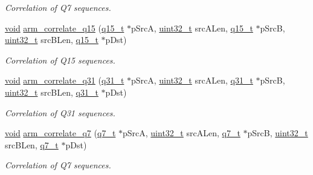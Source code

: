 \begin{DoxyCompactItemize}
\begin{DoxyCompactList}\small\item\em Correlation of Q7 sequences. \end{DoxyCompactList}\item 
\hyperlink{group___n_a_m_e_ga18028b8badbf1ea7e704ccac3c488e82}{void} \hyperlink{group___corr_ga5ec96b8e420d68b0e626df0812274d46}{arm\-\_\-correlate\-\_\-q15} (\hyperlink{arm__math_8h_ab5a8fb21a5b3b983d5f54f31614052ea}{q15\-\_\-t} $\ast$p\-Src\-A, \hyperlink{stdint_8h_a435d1572bf3f880d55459d9805097f62}{uint32\-\_\-t} src\-A\-Len, \hyperlink{arm__math_8h_ab5a8fb21a5b3b983d5f54f31614052ea}{q15\-\_\-t} $\ast$p\-Src\-B, \hyperlink{stdint_8h_a435d1572bf3f880d55459d9805097f62}{uint32\-\_\-t} src\-B\-Len, \hyperlink{arm__math_8h_ab5a8fb21a5b3b983d5f54f31614052ea}{q15\-\_\-t} $\ast$p\-Dst)
\begin{DoxyCompactList}\small\item\em Correlation of Q15 sequences. \end{DoxyCompactList}\item 
\hyperlink{group___n_a_m_e_ga18028b8badbf1ea7e704ccac3c488e82}{void} \hyperlink{group___corr_ga1367dc6c80476406c951e68d7fac4e8c}{arm\-\_\-correlate\-\_\-q31} (\hyperlink{arm__math_8h_adc89a3547f5324b7b3b95adec3806bc0}{q31\-\_\-t} $\ast$p\-Src\-A, \hyperlink{stdint_8h_a435d1572bf3f880d55459d9805097f62}{uint32\-\_\-t} src\-A\-Len, \hyperlink{arm__math_8h_adc89a3547f5324b7b3b95adec3806bc0}{q31\-\_\-t} $\ast$p\-Src\-B, \hyperlink{stdint_8h_a435d1572bf3f880d55459d9805097f62}{uint32\-\_\-t} src\-B\-Len, \hyperlink{arm__math_8h_adc89a3547f5324b7b3b95adec3806bc0}{q31\-\_\-t} $\ast$p\-Dst)
\begin{DoxyCompactList}\small\item\em Correlation of Q31 sequences. \end{DoxyCompactList}\item 
\hyperlink{group___n_a_m_e_ga18028b8badbf1ea7e704ccac3c488e82}{void} \hyperlink{group___corr_ga284ddcc49e4ac532d52a70d0383c5992}{arm\-\_\-correlate\-\_\-q7} (\hyperlink{arm__math_8h_ae541b6f232c305361e9b416fc9eed263}{q7\-\_\-t} $\ast$p\-Src\-A, \hyperlink{stdint_8h_a435d1572bf3f880d55459d9805097f62}{uint32\-\_\-t} src\-A\-Len, \hyperlink{arm__math_8h_ae541b6f232c305361e9b416fc9eed263}{q7\-\_\-t} $\ast$p\-Src\-B, \hyperlink{stdint_8h_a435d1572bf3f880d55459d9805097f62}{uint32\-\_\-t} src\-B\-Len, \hyperlink{arm__math_8h_ae541b6f232c305361e9b416fc9eed263}{q7\-\_\-t} $\ast$p\-Dst)
\begin{DoxyCompactList}\small\item\em Correlation of Q7 sequences. \end{DoxyCompactList}\end{DoxyCompactItemize}


